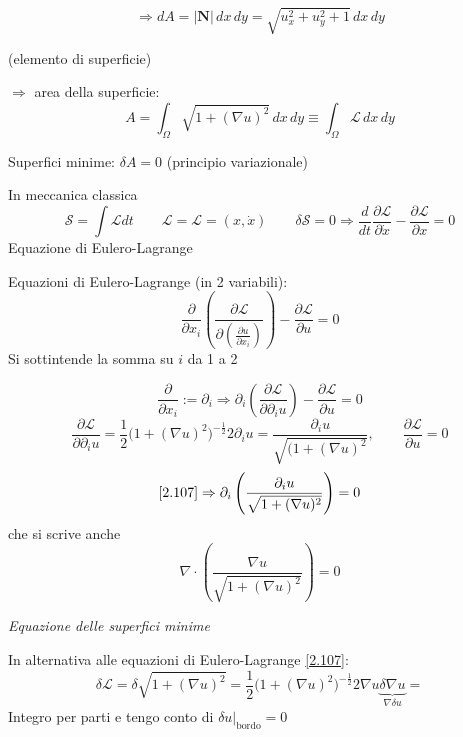 \documentclass[a4paper,11pt]{report}
\newcommand{\vect}[1]{\boldsymbol{#1}}
\begin{document}
\[
\Rightarrow dA = |\vect{N}|\,dx\,dy=\sqrt{u_x^2 + u_y^2 +1}\,dx\,dy 
\]
\centerline{(elemento di superficie)}

$\Rightarrow$ area della superficie:
\begin{equation}
A=\int_{\Omega} \sqrt{1+(\nabla u)^2} \,dx\,dy\equiv \int_{\Omega} \mathcal{L}\,dx\,dy 
\label{2.106}
\end{equation}

Superfici minime: $\delta A=0$ (principio variazionale)

\medskip

In meccanica classica
\[
\mathcal{S}=\int \mathcal{L} dt \qquad \mathcal{L}=\mathcal{L}=(x,\dot{x}) \qquad \delta\mathcal{S}=0 \Rightarrow \frac{d}{dt}\frac{\partial \mathcal{L}}{\partial \dot{x}}-\frac{\partial \mathcal{L}}{\partial x}=0
\]
Equazione di Eulero-Lagrange

\medskip

Equazioni di Eulero-Lagrange (in 2 variabili):
\begin{equation}
\frac{\partial}{\partial x_i}\left( \frac{\partial \mathcal{L}}{\partial (\frac{\partial u}{\partial x_i})} \right)-\frac{\partial \mathcal{L}}{\partial u}=0
\label{2.107}
\end{equation}
Si sottintende la somma su $i$ da 1 a 2

\[
\frac{\partial}{\partial x_i}:=\partial_i \Rightarrow \partial_i \left( \frac{\partial \mathcal{L}}{\partial \partial_i u} \right)-\frac{\partial \mathcal{L}}{\partial u}=0
\]
\[
\frac{\partial\mathcal{L}}{\partial \partial_i u} = \frac{1}{2} \big(1 +(\nabla u)^2\big)^{-\frac{1}{2}} 2\partial_i u=\frac{\partial_i u}{\sqrt{(1+(\nabla u)^2}}, \qquad \frac{\partial \mathcal{L}}{\partial u}=0 
\]
\[
\eqref{2.107}\Rightarrow \partial_i \left( \frac{\partial_i u}{\sqrt{1+(\nabla u)^2}}\right)=0
\]
che si scrive anche
\begin{equation}
\nabla \cdot \left( \frac{\nabla u}{\sqrt{1+(\nabla u)^2}}\right)=0
\label{2.108}
\end{equation}
\centerline{\emph{Equazione delle superfici minime}}

\medskip

In alternativa alle equazioni di Eulero-Lagrange \eqref{2.107}:
\[
\delta\mathcal{L}=\delta\sqrt{1+(\nabla u)^2}=\frac{1}{2}\big(1+(\nabla u)^2\big)^{-\frac{1}{2}}2\nabla u \underbrace{\delta \nabla u}_{\nabla \delta u}=
\]
Integro per parti e tengo conto di $\delta u\big|_\text{bordo}=0$

\medskip
\end{document}

